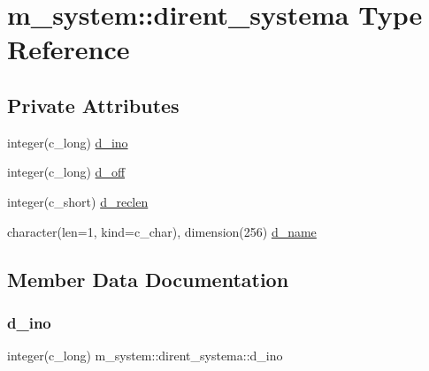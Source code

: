 \hypertarget{structm__system_1_1dirent__systema}{}\section{m\+\_\+system\+:\+:dirent\+\_\+systema Type Reference}
\label{structm__system_1_1dirent__systema}
\subsection*{Private Attributes}
\begin{DoxyCompactItemize}
\item 
integer(c\+\_\+long) \mbox{\hyperlink{structm__system_1_1dirent__systema_af056795fe78ea5cd27c6763f6136a2ac}{d\+\_\+ino}}
\item 
integer(c\+\_\+long) \mbox{\hyperlink{structm__system_1_1dirent__systema_a4f317f4bd63c3aeca25f5f6df681a7d3}{d\+\_\+off}}
\item 
integer(c\+\_\+short) \mbox{\hyperlink{structm__system_1_1dirent__systema_a74c3e2cb9fd26444b7c7837d4ce69baf}{d\+\_\+reclen}}
\item 
character(len=1, kind=c\+\_\+char), dimension(256) \mbox{\hyperlink{structm__system_1_1dirent__systema_a295bfaa44b4193abef0be4980394a0a3}{d\+\_\+name}}
\end{DoxyCompactItemize}


\subsection{Member Data Documentation}
\mbox{\label{structm__system_1_1dirent__systema_af056795fe78ea5cd27c6763f6136a2ac}} 
\subsubsection{\texorpdfstring{d\+\_\+ino}{d\_ino}}
{\footnotesize\ttfamily integer(c\+\_\+long) m\+\_\+system\+::dirent\+\_\+systema\+::d\+\_\+ino\hspace{0.3cm}{\ttfamily [private]}}

\mbox{\label{structm__system_1_1dirent__systema_a295bfaa44b4193abef0be4980394a0a3}} 
